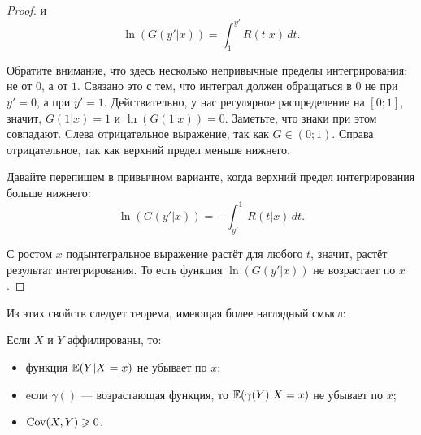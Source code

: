 \begin{proof}
и
\begin{equation}
\ln(G(y'|x))=\int_{1}^{y'}R(t|x) \, dt.
\end{equation}

Обратите внимание, что здесь несколько непривычные пределы интегрирования: не от $0$, а от $ 1 $. Связано это с тем, что интеграл должен обращаться в 0 не при $ y'=0 $, а при $ y'=1 $. Действительно, у нас регулярное распределение на $ [0;1] $, значит, $ G(1|x)=1 $ и $ \ln (G(1|x))=0 $. Заметьте, что знаки при этом совпадают. Cлева отрицательное выражение, так как $ G\in (0;1) $. Справа отрицательное, так как верхний предел меньше нижнего.

Давайте перепишем в привычном варианте, когда верхний предел интегрирования больше нижнего:
\begin{equation}
\ln(G(y'|x))=-\int_{y'}^{1}R(t|x) \, dt.
\end{equation}

С ростом $ x $ подынтегральное выражение растёт для любого $ t $, значит, растёт результат интегрирования. То есть функция $\ln( G(y'|x) )$ не возрастает по $ x $.

\end{proof}



Из этих свойств следует теорема, имеющая более наглядный смысл:
\begin{myth} \label{prop_affiliated}
Если $ X $ и $ Y $ аффилированы, то: 
\begin{itemize}
\item функция $ \operatorname{\mathbb{E}}(Y|X=x )$ не убывает по $ x $;
\item eсли $ \gamma() $ — возрастающая функция, то $ \operatorname{\mathbb{E}}(\gamma(Y)|X=x) $ не убывает по $ x $;
\item $\operatorname{Cov}(X,Y)\geqslant 0 $.
\end{itemize}
\end{myth}


